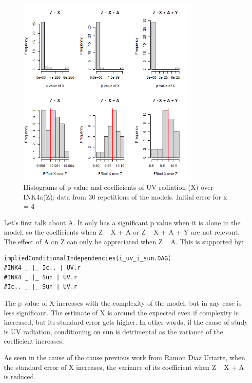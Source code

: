 \documentclass{article}
\begin{document}
\begin{figure}[h]
\caption{Histograms of p value and coefficients of UV radiation (X) over INK4a(Z); data from 30 repetitions of the models. Initial error for x = 4}
\includegraphics[width=9cm]{histX.sun.png}
\centering
\end{figure} 
\newpage
Let's first talk about A. It only has a significant p value when it is alone in the model, so the coefficients when Z ~ X + A or Z ~ X + A + Y are not relevant. The effect of A on Z can only be appreciated when Z ~ A. This is supported by:

\begin{lstlisting}
impliedConditionalIndependencies(i_uv_i_sun.DAG)
#INK4 _||_ Ic.. | UV.r
#INK4 _||_ Sun | UV.r
#Ic.. _||_ Sun | UV.r
\end{lstlisting}

The p value of X increases with the complexity of the model, but in any case is less significant. The estimate of X is around the expected even if complexity is increased, but its standard error gets higher. In other words, if the cause of study is UV radiation, conditioning on sun is detrimental as the variance of the coefficient increases.\par
As seen in the cause of the cause previous work from Ramon Diaz Uriarte, when the standard error of X increases, the variance of its coefficient when Z ~ X + A is reduced.
\end{document}
